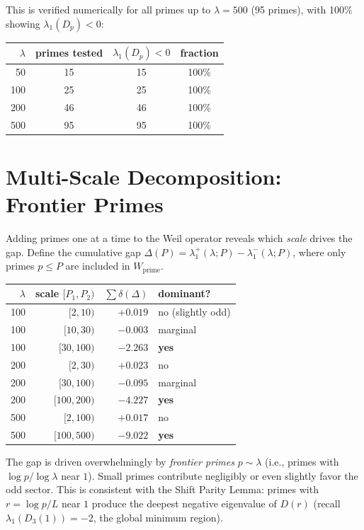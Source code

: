 \documentclass[12pt,a4paper]{article}
\theoremstyle{definition}
\theoremstyle{remark}
\begin{document}
This is verified numerically for all primes up to $\lambda = 500$ (95 primes), with 100\% showing $\lambda_1(D_p) < 0$:

\begin{center}
\renewcommand{\arraystretch}{1.15}
\begin{tabular}{r|c|c|c}
$\lambda$ & primes tested & $\lambda_1(D_p) < 0$ & fraction \\\hline
50 & 15 & 15 & 100\% \\
100 & 25 & 25 & 100\% \\
200 & 46 & 46 & 100\% \\
500 & 95 & 95 & 100\%
\end{tabular}
\end{center}


\section{Multi-Scale Decomposition: Frontier Primes}
\label{sec:frontier}

Adding primes one at a time to the Weil operator reveals which \emph{scale} drives the gap. Define the cumulative gap $\Delta(P) = \lambda_1^+(\lambda; P) - \lambda_1^-(\lambda; P)$, where only primes $p \leq P$ are included in $W_{\mathrm{prime}}$.

\begin{center}
\renewcommand{\arraystretch}{1.15}
\begin{tabular}{r|r|r|l}
$\lambda$ & scale $[P_1, P_2)$ & $\sum \delta(\Delta)$ & dominant? \\\hline
100 & $[2, 10)$ & $+0.019$ & no (slightly odd) \\
100 & $[10, 30)$ & $-0.003$ & marginal \\
100 & $[30, 100)$ & $-2.263$ & \textbf{yes} \\[3pt]
200 & $[2, 30)$ & $+0.023$ & no \\
200 & $[30, 100)$ & $-0.095$ & marginal \\
200 & $[100, 200)$ & $-4.227$ & \textbf{yes} \\[3pt]
500 & $[2, 100)$ & $+0.017$ & no \\
500 & $[100, 500)$ & $-9.022$ & \textbf{yes}
\end{tabular}
\end{center}

The gap is driven overwhelmingly by \emph{frontier primes} $p \sim \lambda$ (i.e., primes with $\log p / \log\lambda$ near $1$). Small primes contribute negligibly or even slightly favor the odd sector. This is consistent with the Shift Parity Lemma: primes with $r = \log p / L$ near $1$ produce the deepest negative eigenvalue of $D(r)$ (recall $\lambda_1(D_3(1)) = -2$, the global minimum region).
\end{document}
